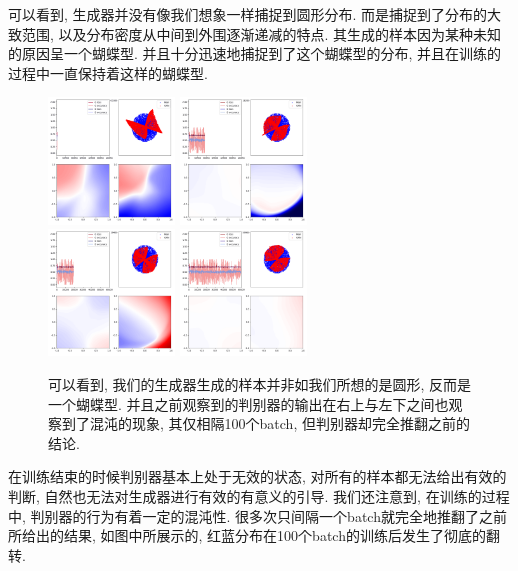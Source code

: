 \documentclass[lang=cn,11pt]{elegantpaper}
\begin{document}
可以看到, 生成器并没有像我们想象一样捕捉到圆形分布. 而是捕捉到了分布的大致范围, 以及分布密度从中间到外围逐渐递减的特点. 其生成的样本因为某种未知的原因呈一个蝴蝶型. 并且十分迅速地捕捉到了这个蝴蝶型的分布, 并且在训练的过程中一直保持着这样的蝴蝶型. 
\begin{figure}[hbp]
  \centering
  \includegraphics[width=0.3\textwidth]{circle_2_1}
  \includegraphics[width=0.3\textwidth]{circle_2_2}\\
  \includegraphics[width=0.3\textwidth]{circle_2_3}
  \includegraphics[width=0.3\textwidth]{circle_2_4}
  \caption{\scriptsize 可以看到, 我们的生成器生成的样本并非如我们所想的是圆形, 反而是一个蝴蝶型. 并且之前观察到的判别器的输出在右上与左下之间也观察到了混沌的现象, 其仅相隔100个batch, 但判别器却完全推翻之前的结论.}
\end{figure}

在训练结束的时候判别器基本上处于无效的状态, 对所有的样本都无法给出有效的判断, 自然也无法对生成器进行有效的有意义的引导. 我们还注意到, 在训练的过程中, 判别器的行为有着一定的混沌性. 很多次只间隔一个batch就完全地推翻了之前所给出的结果, 如图中所展示的, 红蓝分布在100个batch的训练后发生了彻底的翻转. 
\end{document}
